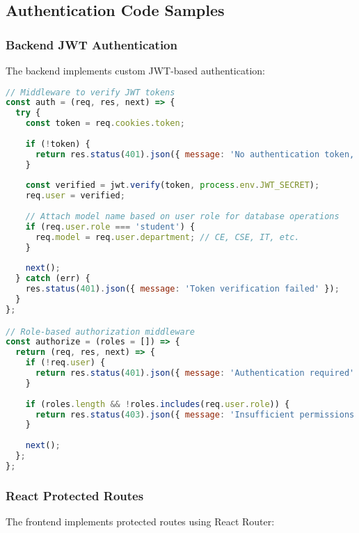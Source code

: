 \documentclass[12pt,a4paper]{report}
\begin{document}
\subsection{Authentication Code Samples}

\subsubsection{Backend JWT Authentication}
The backend implements custom JWT-based authentication:

\begin{lstlisting}[language=JavaScript, caption=JWT Authentication Middleware]
// Middleware to verify JWT tokens
const auth = (req, res, next) => {
  try {
    const token = req.cookies.token;
    
    if (!token) {
      return res.status(401).json({ message: 'No authentication token, access denied' });
    }
    
    const verified = jwt.verify(token, process.env.JWT_SECRET);
    req.user = verified;
    
    // Attach model name based on user role for database operations
    if (req.user.role === 'student') {
      req.model = req.user.department; // CE, CSE, IT, etc.
    }
    
    next();
  } catch (err) {
    res.status(401).json({ message: 'Token verification failed' });
  }
};

// Role-based authorization middleware
const authorize = (roles = []) => {
  return (req, res, next) => {
    if (!req.user) {
      return res.status(401).json({ message: 'Authentication required' });
    }
    
    if (roles.length && !roles.includes(req.user.role)) {
      return res.status(403).json({ message: 'Insufficient permissions' });
    }
    
    next();
  };
};
\end{lstlisting}

\subsubsection{React Protected Routes}
The frontend implements protected routes using React Router:
\end{document}
